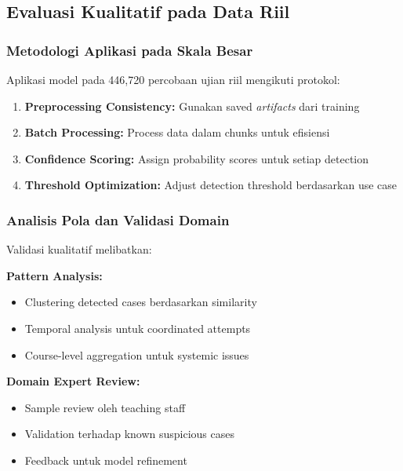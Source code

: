\subsection{Evaluasi Kualitatif pada Data Riil}
\label{sec:evaluasiKualitatif}

\subsubsection{Metodologi Aplikasi pada Skala Besar}
\label{sec:aplikasiSkalaBesar}

Aplikasi model pada 446,720 percobaan ujian riil mengikuti protokol:

\begin{enumerate}
    \item \textbf{Preprocessing Consistency:} Gunakan saved \textit{artifacts} dari training
    \item \textbf{Batch Processing:} Process data dalam chunks untuk efisiensi
    \item \textbf{Confidence Scoring:} Assign probability scores untuk setiap detection
    \item \textbf{Threshold Optimization:} Adjust detection threshold berdasarkan use case
\end{enumerate}

\subsubsection{Analisis Pola dan Validasi Domain}
\label{sec:analisisPolaValidasi}

Validasi kualitatif melibatkan:

\textbf{Pattern Analysis:}
\begin{itemize}
    \item Clustering detected cases berdasarkan similarity
    \item Temporal analysis untuk coordinated attempts
    \item Course-level aggregation untuk systemic issues
\end{itemize}

\textbf{Domain Expert Review:}
\begin{itemize}
    \item Sample review oleh teaching staff
    \item Validation terhadap known suspicious cases
    \item Feedback untuk model refinement
\end{itemize}

